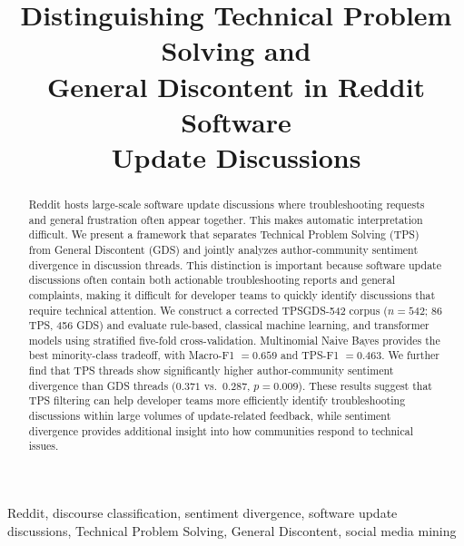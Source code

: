 \documentclass[conference]{IEEEtran}
\begin{document}
\title{Distinguishing Technical Problem Solving and\\
General Discontent in Reddit Software\\
Update Discussions}

\author{
}
\maketitle

\begin{abstract}
Reddit hosts large-scale software update discussions where troubleshooting requests and general frustration often appear together. This makes automatic interpretation difficult. We present a framework that separates Technical Problem Solving (TPS) from General Discontent (GDS) and jointly analyzes author-community sentiment divergence in discussion threads. This distinction is important because software update discussions often contain both actionable troubleshooting reports and general complaints, making it difficult for developer teams to quickly identify discussions that require technical attention. We construct a corrected TPSGDS-542 corpus (\(n=542\); 86 TPS, 456 GDS) and evaluate rule-based, classical machine learning, and transformer models using stratified five-fold cross-validation. Multinomial Naive Bayes provides the best minority-class tradeoff, with Macro-F1 \(=0.659\) and TPS-F1 \(=0.463\). We further find that TPS threads show significantly higher author-community sentiment divergence than GDS threads (\(0.371\) vs.\ \(0.287\), \(p=0.009\)). These results suggest that TPS filtering can help developer teams more efficiently identify troubleshooting discussions within large volumes of update-related feedback, while sentiment divergence provides additional insight into how communities respond to technical issues.
\end{abstract}

\begin{IEEEkeywords}
Reddit, discourse classification, sentiment divergence,
software update discussions, Technical Problem Solving,
General Discontent, social media mining
\end{IEEEkeywords}
\end{document}
